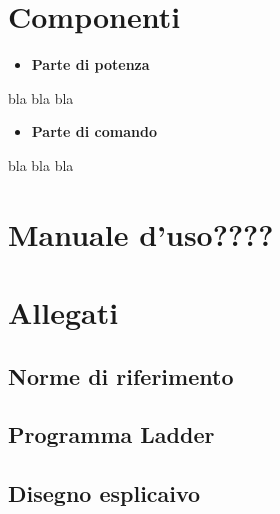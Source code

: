 \documentclass[12pt]{article}
\begin{document}
\section{Componenti}

\begin{itemize}
    \item \textbf{Parte di potenza}
\end{itemize}
\noindent
bla
bla
bla
\begin{itemize}
    \item \textbf{Parte di comando}
\end{itemize}
bla
bla
bla
\section{Manuale d'uso????}


\section{Allegati}
\subsection{Norme di riferimento}
\subsection{Programma Ladder}
\subsection{Disegno esplicaivo}

\newpage
\end{document}
